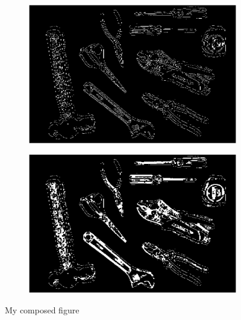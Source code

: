 \documentclass[a4paper, 11pt]{article}
\begin{document}
\begin{figure}[h]
  \begin{subfigure}{0.45\linewidth}
    \includegraphics[width=\linewidth]{paso3}
    \caption{}
    \label{fig:1a}
  \end{subfigure}\hfill
  \begin{subfigure}{0.45\linewidth}
    \includegraphics[width=\linewidth]{paso4}
    \caption{}
    \label{fig:1a}
  \end{subfigure}
  \caption{My composed figure}
  \label{fig:1}
\end{figure}
\end{document}
